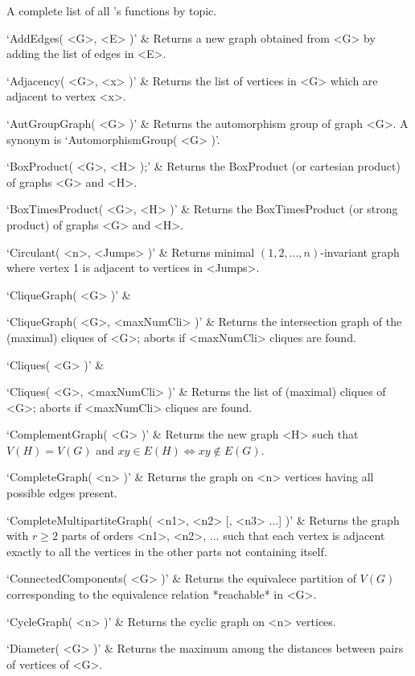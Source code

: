 
A complete list of all {\YAGS}'s functions by topic.


\beginitems
`AddEdges( <G>, <E> )' & 
Returns a new graph obtained from <G> by adding the list of edges in <E>.

`Adjacency( <G>, <x> )' & 
Returns the list of vertices in <G> which are adjacent to vertex <x>.

`AutGroupGraph( <G> )' & 
Returns the automorphism group of graph <G>. A synonym is `AutomorphismGroup( <G> )'.

`BoxProduct( <G>, <H> );' & 
Returns the BoxProduct (or cartesian product) of graphs <G> and <H>.

`BoxTimesProduct( <G>, <H> )' & 
Returns the BoxTimesProduct (or strong product) of graphs <G> and <H>.

`Circulant( <n>, <Jumps> )' & 
Returns minimal $(1, 2, ..., n)$-invariant graph where vertex 1 is adjacent to vertices in <Jumps>.

`CliqueGraph( <G> )' & 

`CliqueGraph( <G>, <maxNumCli> )' & 
Returns the intersection graph of the (maximal) cliques of <G>; aborts if <maxNumCli> cliques are found.

`Cliques( <G> )' & 

`Cliques( <G>, <maxNumCli> )' & 
Returns the list of (maximal) cliques of <G>; aborts if <maxNumCli> cliques are found.

`ComplementGraph( <G> )' & 
Returns the new graph <H> such that  $V(H)=V(G)$ and $xy\in E(H) \iff xy \not\in E(G)$.

`CompleteGraph( <n> )' & 
Returns the graph on <n> vertices having all possible edges present.

`CompleteMultipartiteGraph( <n1>, <n2> [, <n3> ...] )' & 
Returns the graph with $r\geq 2$ parts of orders <n1>, <n2>, ... such that each vertex is adjacent exactly to all the vertices in the other parts not containing itself.

`ConnectedComponents( <G> )' & 
Returns the equivalece partition of $V(G)$ corresponding to the equivalence relation *reachable* in <G>.

`CycleGraph( <n> )' & 
Returns the cyclic graph on <n> vertices. 

`Diameter( <G> )' & 
Returns the maximum among the distances between pairs of vertices of <G>.

